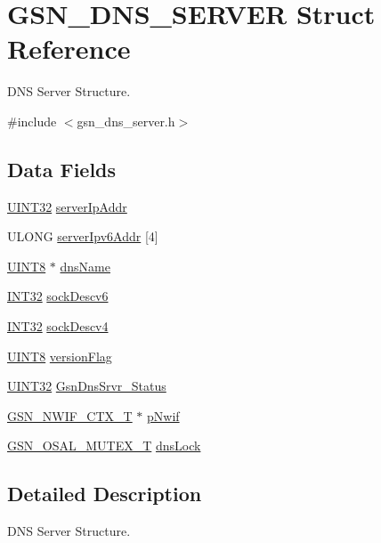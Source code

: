 \hypertarget{a00055}{
\section{GSN\_\-DNS\_\-SERVER Struct Reference}
\label{a00055}
}


DNS Server Structure.  




{\ttfamily \#include $<$gsn\_\-dns\_\-server.h$>$}

\subsection*{Data Fields}
\begin{DoxyCompactItemize}
\item 
\hyperlink{a00660_gae1e6edbbc26d6fbc71a90190d0266018}{UINT32} \hyperlink{a00055_a09261ac30de0001f89753c8f3869ad2f}{serverIpAddr}
\item 
ULONG \hyperlink{a00055_a7f1f7891e264201060f498798b450a8b}{serverIpv6Addr} \mbox{[}4\mbox{]}
\item 
\hyperlink{a00660_gab27e9918b538ce9d8ca692479b375b6a}{UINT8} $\ast$ \hyperlink{a00055_a7063be62a4ac374e6b6228f590720d7c}{dnsName}
\item 
\hyperlink{a00660_ga63021d67d54286c2163bcdb43a6f2569}{INT32} \hyperlink{a00055_a8edc1f578eda1ef92041687d5d0b5a0c}{sockDescv6}
\item 
\hyperlink{a00660_ga63021d67d54286c2163bcdb43a6f2569}{INT32} \hyperlink{a00055_a4074c310b3e312fa174c6fa7c211cbad}{sockDescv4}
\item 
\hyperlink{a00660_gab27e9918b538ce9d8ca692479b375b6a}{UINT8} \hyperlink{a00055_a7d1eb61b5440a79b7efef1031c5a1333}{versionFlag}
\item 
\hyperlink{a00660_gae1e6edbbc26d6fbc71a90190d0266018}{UINT32} \hyperlink{a00055_a9cd77fc2426c7e03a911fa7461c60716}{GsnDnsSrvr\_\-Status}
\item 
\hyperlink{a00167}{GSN\_\-NWIF\_\-CTX\_\-T} $\ast$ \hyperlink{a00055_a98d510676ecd134a5e9ac61bf222cded}{pNwif}
\item 
\hyperlink{a00628_gae997291afc7166c897f459023e0154ad}{GSN\_\-OSAL\_\-MUTEX\_\-T} \hyperlink{a00055_a1bbe64de092f51bf05b4e6259a27e1d0}{dnsLock}
\end{DoxyCompactItemize}


\subsection{Detailed Description}
DNS Server Structure. 

